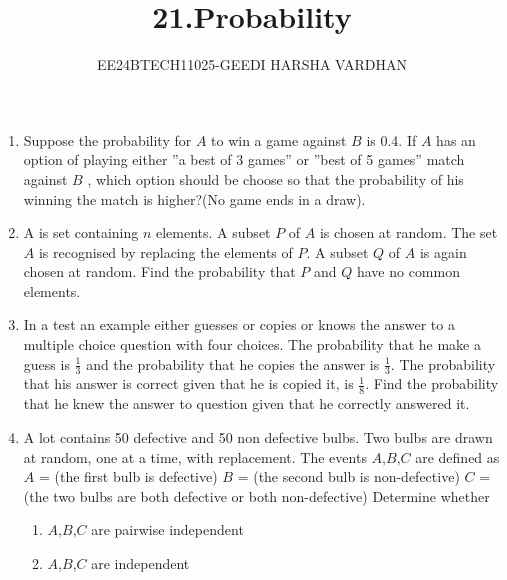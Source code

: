 \documentclass[journal,12pt,onecolumn]{IEEEtran}
\theoremstyle{remark}
\begin{document}

\vspace{3cm}

\title{21.Probability}
\author{EE24BTECH11025-GEEDI HARSHA VARDHAN}
\maketitle
\bigskip

\renewcommand{\thefigure}{\theenumi}
\renewcommand{\thetable}{\theenumi}




\begin{enumerate}
	\item Suppose the probability for $A$ to win a game against $B$ is 0.4. If $A$ has an option of playing either ''a best of 3 games'' or  ''best of 5 games'' match against $B$ , which option should be choose so that the probability of his winning the match is higher?(No game ends in a draw).

\hfill{}

\item A is set containing $n$ elements. A subset $P$ of $A$ is chosen at random. The set $A$ is recognised by replacing the elements of $P$. A subset $Q$ of $A$ is again chosen at random. Find the probability that $P$ and $Q$ have no common elements.

\hfill{}

\item In a test an example either guesses or copies or knows the answer to a multiple choice question with four choices. The probability that he make a guess is $\frac{1}{3}$ and the probability that he copies the answer is $\frac{1}{3}$. The probability that his answer is correct given that he is copied it, is $\frac{1}{8}$. Find the probability that he knew the answer to question given that he correctly answered it.

\hfill{}



\item A lot contains 50 defective and 50 non defective bulbs. Two bulbs are drawn at random, one at a time, with replacement. The events $A$,$B$,$C$ are defined as 
$A$ = (the first bulb is defective)
$B$ = (the second bulb is non-defective)
$C$ =(the two bulbs are both defective or both non-defective)
Determine whether
\begin{enumerate}
\item $A$,$B$,$C$ are pairwise independent
\item $A$,$B$,$C$ are independent
\end{enumerate}


\end{enumerate}
\end{document}
